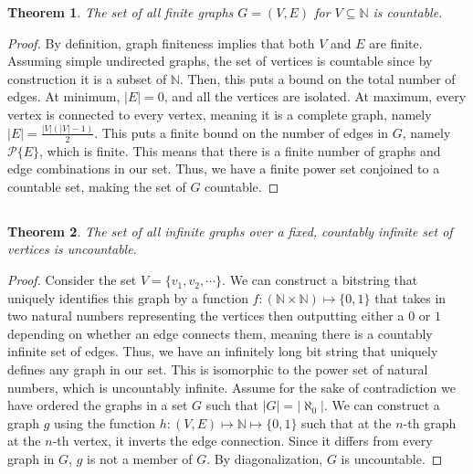 \documentclass{article}
\newtheorem{theorem}{Theorem}
\newcommand{\N}{\mathbb{N}}
\begin{document}
\begin{theorem}
    The set of all finite graphs \(G = (V, E)\) for \(V \subseteq \N\) is countable.
\end{theorem}
\begin{proof}
    By definition, graph finiteness implies that both \(V\) and \(E\) are finite.
    Assuming simple undirected graphs, the set of vertices is countable since by construction it is a subset of \(\N\).
    Then, this puts a bound on the total number of edges.
    At minimum, \(|E| = 0\), and all the vertices are isolated.
    At maximum, every vertex is connected to every vertex, meaning it is a complete graph, namely \(|E| = \frac{|V| (|V| - 1)}{2}\).
    This puts a finite bound on the number of edges in \(G\), namely \(\mathcal{P}\{E\}\), which is finite.
    This means that there is a finite number of graphs and edge combinations in our set.
    Thus, we have a finite power set conjoined to a countable set, making the set of \(G\) countable.
\end{proof}

\subsection{}

\begin{theorem}
    The set of all infinite graphs over a fixed, countably infinite set of vertices is uncountable.
\end{theorem}
\begin{proof}
    Consider the set \(V = \{v_1, v_2, \cdots\}\).
    We can construct a bitstring that uniquely identifies this graph by a function \(f: (\N \times \N) \mapsto \{0, 1\}\) that takes in two natural numbers representing the vertices then outputting either a \(0\) or \(1\) depending on whether an edge connects them, meaning there is a countably infinite set of edges.
    Thus, we have an infinitely long bit string that uniquely defines any graph in our set.
    This is isomorphic to the power set of natural numbers, which is uncountably infinite.
    Assume for the sake of contradiction we have ordered the graphs in a set \(G\) such that \(|G| = |\aleph_0|\).
    We can construct a graph \(g\) using the function \(h: (V, E) \mapsto \N \mapsto \{0, 1\}\) such that at the \(n\)-th graph at the \(n\)-th vertex, it inverts the edge connection.
    Since it differs from every graph in \(G\), \(g\) is not a member of \(G\).
    By diagonalization, \(G\) is uncountable.
\end{proof}
\end{document}
